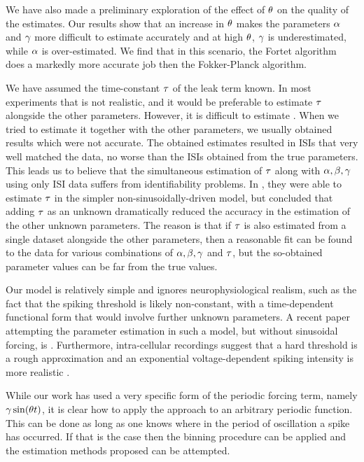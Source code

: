 We have also made a preliminary exploration of the effect of ${ \theta}$ on the
quality of the estimates. Our results show that an increase in ${ \theta}$ makes the
parameters $\alpha$ and ${\gamma }$ more difficult to estimate accurately and at high
${ \theta}$, ${\gamma }$ is underestimated, while $\alpha$ is over-estimated. We find that in
this scenario, the Fortet algorithm does a markedly more accurate job then the
Fokker-Planck algorithm.
 
We have assumed  the time-constant ${\tau}$ of the leak term known. In most
experiments that is not realistic, and it would be preferable to estimate ${\tau}$
alongside the other parameters. However, it is difficult to estimate
\cite{DitlevsenLansky212}. When we tried to estimate it together with the other
parameters, we usually obtained results which were not accurate. The obtained
estimates resulted in ISIs that very well matched the data, no worse than the
ISIs obtained from the true parameters. This leads us to believe that the
simultaneous estimation of ${\tau}$ along with ${\alpha,\beta,{\gamma } }$ using only ISI data suffers
from identifiability problems. In \cite{Mullowney2008}, they were able to
estimate ${\tau}$ in the simpler non-sinusoidally-driven model, but concluded that
adding ${\tau}$ as an unknown dramatically reduced the accuracy in the estimation of
the other unknown parameters. The reason is that if ${\tau}$ is also estimated from
a single dataset alongside the other parameters, then a reasonable fit can be
found to the data for various combinations of ${\alpha,\beta,{\gamma } }$ and ${\tau}$, but the so-obtained
parameter values can be far from the true values.

Our model is relatively simple and ignores neurophysiological realism, such as
the fact that the spiking threshold is likely non-constant, with a
time-dependent functional form that would involve further unknown parameters. A
recent paper attempting the parameter estimation in such a model, but without
sinusoidal forcing, is \cite{Dong2011}. Furthermore, intra-cellular recordings
suggest that a hard threshold is a rough approximation and an exponential
voltage-dependent spiking intensity is more realistic \cite{Jahn2011}.

While our work has used a very specific form of the periodic forcing term,
namely ${\gamma } \sin({ \theta} t)$,  it is clear how to apply the approach to an arbitrary
periodic function. This can be done as long as one knows where in the period of
oscillation a spike has occurred. If that is the case then the binning procedure
can be applied and the estimation methods proposed can be attempted. 

